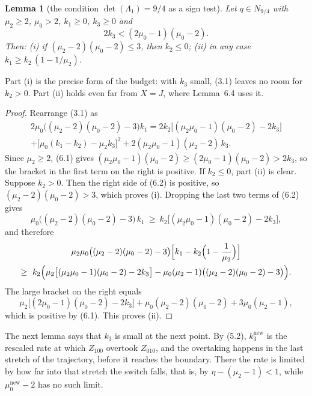\documentclass[11pt,a4paper]{article}
\theoremstyle{plain}
\newtheorem{lemma}[theorem]{Lemma}
\theoremstyle{definition}
\theoremstyle{remark}
\newcommand{\nw}{^{\mathrm{new}}}
\begin{document}
\begin{lemma}[the condition $\det(\Lambda_1)=9/4$ as a sign test]
Let $q\in N_{9/4}$ with $\mu_2\ge2$, $\mu_0>2$, $k_1\ge0$, $k_3\ge0$ and
\begin{equation}\tag{6.1}
2k_3<(2\mu_0-1)(\mu_0-2).
\end{equation}
Then: \textup{(i)} if $(\mu_2-2)(\mu_0-2)\le3$, then $k_2\le0$; \textup{(ii)} in any case
$k_1\ge k_2\,(1-1/\mu_2)$.
\end{lemma}

Part (i) is the precise form of the budget: with $k_3$ small, (3.1) leaves no room for $k_2>0$.
Part (ii) holds even far from $X=J$, where Lemma~6.4 uses it.

\begin{proof}
Rearrange (3.1) as
\begin{multline}\tag{6.2}
2\mu_0\bigl((\mu_2-2)(\mu_0-2)-3\bigr)k_1
=2k_2\bigl[(\mu_2\mu_0-1)(\mu_0-2)-2k_3\bigr]\\
+\bigl[\mu_0(k_1-k_2)-\mu_2k_3\bigr]^2+2(\mu_2\mu_0-1)(\mu_2-2)\,k_3 .
\end{multline}
Since $\mu_2\ge2$, (6.1) gives $(\mu_2\mu_0-1)(\mu_0-2)\ge(2\mu_0-1)(\mu_0-2)>2k_3$, so the bracket
in the first term on the right is positive. If $k_2\le0$, part (ii) is clear. Suppose $k_2>0$. Then
the right side of (6.2) is positive, so $(\mu_2-2)(\mu_0-2)>3$, which proves (i). Dropping the last
two terms of (6.2) gives
\[
\mu_0\bigl((\mu_2-2)(\mu_0-2)-3\bigr)\,k_1\ \ge\ k_2\bigl[(\mu_2\mu_0-1)(\mu_0-2)-2k_3\bigr],
\]
and therefore
\begin{multline*}
\mu_2\mu_0\bigl((\mu_2-2)(\mu_0-2)-3\bigr)\Bigl[k_1-k_2\Bigl(1-\frac1{\mu_2}\Bigr)\Bigr]\\
\ge\ k_2\Bigl(\mu_2\bigl[(\mu_2\mu_0-1)(\mu_0-2)-2k_3\bigr]
-\mu_0(\mu_2-1)\bigl((\mu_2-2)(\mu_0-2)-3\bigr)\Bigr).
\end{multline*}
The large bracket on the right equals
\[
\mu_2\bigl[(2\mu_0-1)(\mu_0-2)-2k_3\bigr]+\mu_0(\mu_2-2)(\mu_0-2)+3\mu_0(\mu_2-1),
\]
which is positive by (6.1). This proves (ii).
\end{proof}

The next lemma says that $k_3$ is small at the next point. By (5.2), $k_3\nw$ is the rescaled
rate at which $Z_{100}$ overtook $Z_{010}$, and the overtaking happens in the last stretch of the
trajectory, before it reaches the boundary. There the rate is limited by how far into that stretch
the switch falls, that is, by $\eta-(\mu_2-1)<1$, while $\mu_0\nw-2$ has no such limit.
\end{document}
